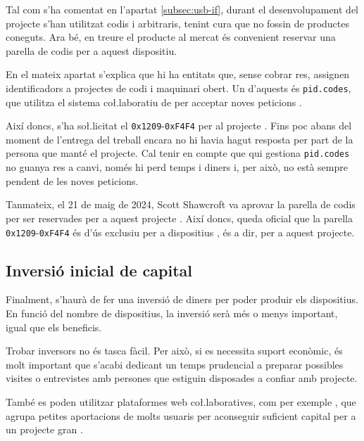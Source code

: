 Tal com s'ha comentat en l'apartat \ref{subsec:usb-if}, durant el desenvolupament
del projecte s'han utilitzat codis  i  arbitraris, tenint
cura que no fossin de productes coneguts. Ara bé, en treure el producte al
mercat és convenient reservar una parella de codis per a aquest dispositiu.

En el mateix apartat s'explica que hi ha entitats que, sense cobrar res, assignen
identificadors a projectes de codi i maquinari obert. Un d'aquests és
\texttt{pid.codes}, que utilitza el sistema co\l.laboratiu de  per
acceptar noves peticions \cite{PidCodes}.

Així doncs, s'ha so\l.licitat el  \texttt{0x1209}-\texttt{0xF4F4}
per al projecte . Fins poc abans del moment de l'entrega del
treball encara no hi havia hagut resposta per part de la persona que manté el
projecte. Cal tenir en compte que qui gestiona \texttt{pid.codes} no guanya res
a canvi, només hi perd temps i diners \cite{PidCodesFaq} i, per això, no està
sempre pendent de les noves peticions.

Tanmateix, el 21 de maig de 2024, Scott Shawcroft va aprovar la parella de codis
 per ser reservades per a aquest projecte \cite{PidCodesPR}.
Així doncs, queda oficial que la parella \texttt{0x1209}-\texttt{0xF4F4} és
d'ús exclusiu per a dispositius , és a dir, per a aquest
projecte.

\subsection{Inversió inicial de capital}

Finalment, s'haurà de fer una inversió de diners per poder produir els
dispositius. En funció del nombre de dispositius, la inversió serà més o menys
important, igual que els beneficis.

Trobar inversors no és tasca fàcil. Per això, si es necessita suport
econòmic, és molt important que s'acabi dedicant un temps prudencial a preparar
possibles visites o entrevistes amb persones que estiguin disposades a confiar
amb projecte.

També es poden utilitzar plataformes web co\l.laboratives, com per exemple
, que agrupa petites aportacions de molts usuaris per
aconseguir suficient capital per a un projecte gran \cite{Kickstarter}.
